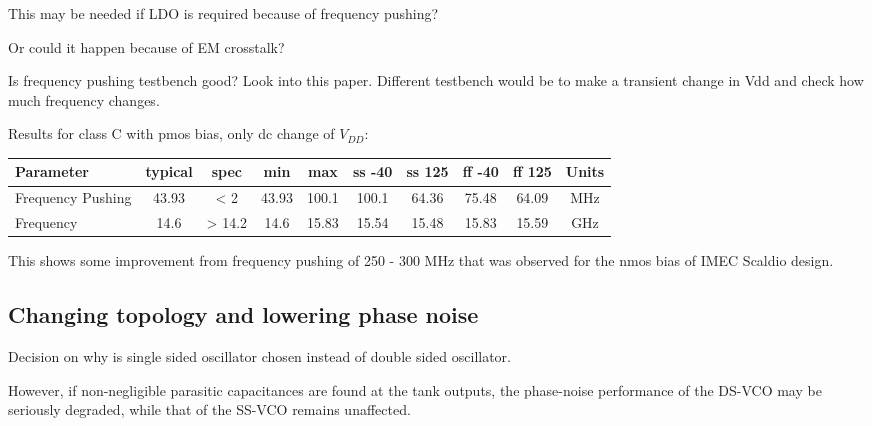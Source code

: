\begin{question}
	This may be needed if LDO is required because of frequency pushing?
\end{question}

\begin{question}
	Or could it happen because of EM crosstalk?
\end{question}


Is frequency pushing testbench good? Look into this paper. %
Different testbench would be to make a transient change in Vdd and check how much frequency changes.


Results for class C with pmos bias, only dc change of $V_{DD}$:

\begin{center}
	\begin{tabular}{|l|c|c|c|c|c|c|c|c|c|}
		\hline
		Parameter & typical & spec  & min & max & ss -40 & ss 125 & ff -40 & ff 125 & Units \\
		\hline
		Frequency Pushing & 43.93 & < 2 &  43.93 & 100.1 & 100.1 & 64.36 & 75.48 & 64.09 & MHz \\ 
		\hline
		Frequency  & 14.6 & > 14.2  & 14.6 & 15.83 & 15.54 & 15.48 & 15.83 & 15.59 & GHz  \\ 
		\hline
	\end{tabular}
\end{center}

This shows some improvement from frequency pushing of 250 - 300 MHz that was observed for the nmos bias of IMEC Scaldio design.

\subsection{Changing topology and lowering phase noise}

Decision on why is single sided oscillator chosen instead of double sided oscillator.

\begin{info}
However, if non-negligible parasitic capacitances are found at the tank outputs, the phase-noise performance of the DS-VCO may be seriously degraded, while that of the SS-VCO remains unaffected.
\end{info}

